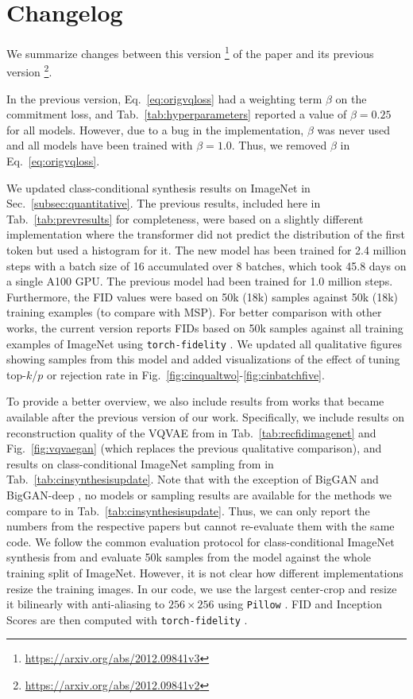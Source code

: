 \documentclass[final]{cvpr}
\begin{document}
\section{Changelog}
\label{sec:changelog}
\cinsynthesis
\noindent We summarize changes between this version
\footnote{\url{https://arxiv.org/abs/2012.09841v3}}
of the paper and its previous version 
\footnote{\url{https://arxiv.org/abs/2012.09841v2}}.

In the previous version, Eq.~\eqref{eq:origvqloss} had a weighting term $\beta$
on the commitment loss, and Tab.~\ref{tab:hyperparameters} reported a value of
$\beta=0.25$ for all models. However, due to a bug in the implementation,
$\beta$ was never used and all models have been trained with $\beta=1.0$. Thus,
we removed $\beta$ in Eq.~\eqref{eq:origvqloss}.

We updated class-conditional synthesis results on ImageNet in
Sec.~\ref{subsec:quantitative}. The previous
results, included here in Tab.~\ref{tab:prevresults} for completeness, were based
on a slightly different implementation where the transformer did not predict
the distribution of the first token but used a histogram for it. The new model
has been trained for 2.4 million steps with a batch size of 16 accumulated over 8
batches, which took 45.8 days on a single A100 GPU. The previous model
had been trained for 1.0 million steps.
Furthermore, the FID values were based on 50k (18k) samples against 50k (18k)
training examples (to compare with MSP). For better comparison with other
works, the current version reports FIDs based on 50k samples against all
training examples of ImageNet using \texttt{torch-fidelity}
\cite{obukhov2020torchfidelity}. We updated all qualitative figures
showing samples from this model and added visualizations of the effect
of tuning top-$k$/$p$ or rejection rate in Fig.~\ref{fig:cinqualtwo}-\ref{fig:cinbatchfive}.

To provide a better overview, we also include results from works that became
available after the previous version of our work. Specifically, we include
results on reconstruction quality of the VQVAE from \cite{ramesh2021zeroshot}
in Tab.~\ref{tab:recfidimagenet} and Fig.~\ref{fig:vqvaegan} (which replaces
the previous qualitative comparison), and results on class-conditional ImageNet
sampling from
\cite{nichol2021improved,nash2021generating,dhariwal2021diffusion} in
Tab.~\ref{tab:cinsynthesisupdate}. Note that with the exception of BigGAN and
BigGAN-deep \cite{brock2018large}, no models or sampling results are available
for the methods we compare to in Tab.~\ref{tab:cinsynthesisupdate}. Thus, we
can only report the numbers from the respective papers but cannot re-evaluate
them with the same code. We follow the common evaluation protocol for
class-conditional ImageNet synthesis from \cite{brock2018large} and evaluate
50k samples from the model against the whole training split of ImageNet.
However, it is not clear how different implementations resize the training
images. In our code, we use the largest center-crop and resize it bilinearly
with anti-aliasing to $256 \times 256$ using \texttt{Pillow}
\cite{hugo_van_kemenade_2021_4659051}. FID and Inception Scores are then
computed with \texttt{torch-fidelity} \cite{obukhov2020torchfidelity}.
\end{document}
